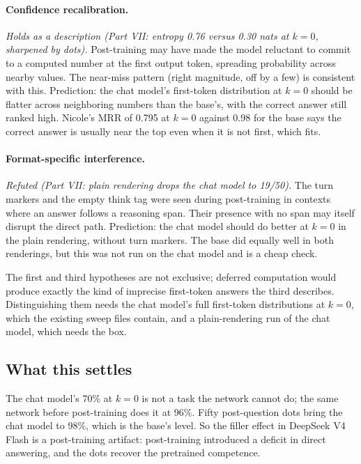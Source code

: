 \documentclass[11pt]{article}
\begin{document}
\paragraph{Confidence recalibration.} \emph{Holds as a description (Part VII: entropy 0.76 versus 0.30 nats at $k=0$, sharpened by dots).} Post-training may have made the model reluctant to commit to a computed number at the first output token, spreading probability across nearby values. The near-miss pattern (right magnitude, off by a few) is consistent with this. Prediction: the chat model's first-token distribution at $k=0$ should be flatter across neighboring numbers than the base's, with the correct answer still ranked high. Nicole's MRR of 0.795 at $k=0$ against 0.98 for the base says the correct answer is usually near the top even when it is not first, which fits.

\paragraph{Format-specific interference.} \emph{Refuted (Part VII: plain rendering drops the chat model to 19/50).} The turn markers and the empty think tag were seen during post-training in contexts where an answer follows a reasoning span. Their presence with no span may itself disrupt the direct path. Prediction: the chat model should do better at $k=0$ in the plain rendering, without turn markers. The base did equally well in both renderings, but this was not run on the chat model and is a cheap check.

The first and third hypotheses are not exclusive; deferred computation would produce exactly the kind of imprecise first-token answers the third describes. Distinguishing them needs the chat model's full first-token distributions at $k=0$, which the existing sweep files contain, and a plain-rendering run of the chat model, which needs the box.

\subsection{What this settles}

The chat model's 70\% at $k=0$ is not a task the network cannot do; the same network before post-training does it at 96\%. Fifty post-question dots bring the chat model to 98\%, which is the base's level. So the filler effect in DeepSeek V4 Flash is a post-training artifact: post-training introduced a deficit in direct answering, and the dots recover the pretrained competence.
\end{document}
